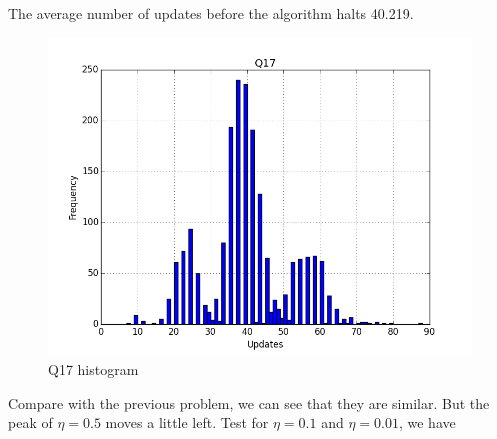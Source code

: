 \documentclass[12pt]{article}
\begin{document}
The average number
of updates before the algorithm halts 40.219.
\begin{figure}[h]
\centering
\includegraphics[scale=0.2]{Q17}
\caption{Q17 histogram}
\label{Q17}
\end{figure}
Compare with the previous problem, we can see that they are similar. But the peak of $\eta=0.5$ moves a little left. Test for $\eta=0.1$ and $\eta=0.01$, we have
\newpage
\end{document}
